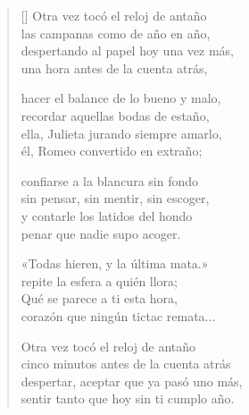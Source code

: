 \documentclass[a4paper,11pt]{letter}
\begin{document}

\settowidth{\versewidth}{Sentir tanto que hoy sin ti cumplo año.}

\bigskip

\begin{verse}[\versewidth]
Otra vez tocó el reloj de antaño \\
las campanas como de año en año, \\
despertando al papel hoy una vez más, \\
una hora antes de la cuenta atrás,

hacer el balance de lo bueno y malo, \\
recordar aquellas bodas de estaño, \\
ella, Julieta jurando siempre amarlo, \\
él, Romeo convertido en extraño;

confiarse a la blancura sin fondo \\
sin pensar, sin mentir, sin escoger, \\
y contarle los latidos del hondo \\
penar que nadie supo acoger.

«Todas hieren, y la última mata.» \\
repite la esfera a quién llora; \\
Qué se parece a ti esta hora, \\
corazón que ningún tictac remata...

Otra vez tocó el reloj de antaño \\
cinco minutos antes de la cuenta atrás \\
despertar, aceptar que ya pasó uno más, \\
sentir tanto que hoy sin ti cumplo año.
\end{verse}
\end{document}
